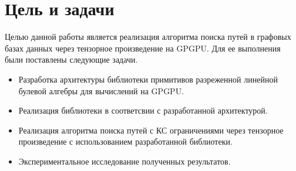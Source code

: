 \section{Цель и задачи}

Целью данной работы является реализация алгоритма поиска путей в графовых базах данных через тензорное произведение на GPGPU. Для ее выполнения были поставлены следующие задачи.

\begin{itemize}
    \item Разработка архитектуры библиотеки примитивов разреженной линейной булевой алгебры для вычислений на GPGPU.
    \item Реализация библиотеки в соответсвии с разработанной архитектурой.
    \item Реализация алгоритма поиска путей с КС ограничениями через тензорное произведение с использованием разработанной библиотеки.
    \item Экспериментальное исследование полученных результатов.
\end{itemize}